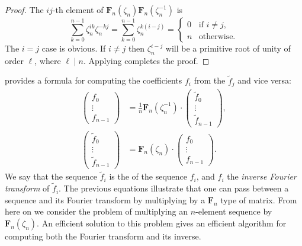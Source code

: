 \begin{proof}
The $ij$-th element of $\mathbf{F}_n(\zeta_n) \mathbf{F}_n(\zeta_n^{-1})$ is
\[
\sum_{k=0}^{n-1} \zeta_n^{ik} \zeta_n^{-kj} = 
\sum_{k=0}^{n-1} \zeta_n^{k(i - j)} = 
\begin{cases} 
  0 & \text{if $i \not= j$,} \\
  n & \text{otherwise.}
\end{cases}
\]
The $i = j$ case is obvious.  If $i\not= j$ then $\zeta_n^{i-j}$ will
be a primitive root of unity of order
$\ell$, where $\ell \mid n$.  Applying
 completes the proof.
\end{proof}

 provides a formula for computing the
coefficients $f_i$ from the $\tilde{f}_j$ and vice versa:
\[
\begin{aligned}
\left(\begin{array}{c} f_0 \\ \vdots \\ f_{n-1} \end{array}\right)
&= 
\frac{1}{n} \mathbf{F}_n(\zeta_n^{-1}) \cdot
\left(\begin{array}{c} \tilde{f}_0 \\ \vdots \\ \tilde{f}_{n-1}
\end{array}\right), \\
\left(\begin{array}{c} \tilde{f}_0 \\ \vdots \\ \tilde{f}_{n-1}
\end{array}\right)
&= 
\mathbf{F}_n(\zeta_n) \cdot
\left(\begin{array}{c} f_0 \\ \vdots \\ f_{n-1} \end{array}\right). 
\end{aligned}
\]
We say that the sequence $\tilde{f}_i$ is the 
of the sequence $f_i$, and $f_i$ the {\em inverse Fourier
transform} of $\tilde{f}_i$.  The
previous equations illustrate that one can pass between a sequence and
its Fourier transform by multiplying by a $\mathbf{F}_n$ type of matrix.
From here on we consider the problem of multiplying an $n$-element
sequence by $\mathbf{F}_n(\zeta_n)$.  An efficient solution to this
problem gives an efficient algorithm for computing both the Fourier
transform and its inverse.

